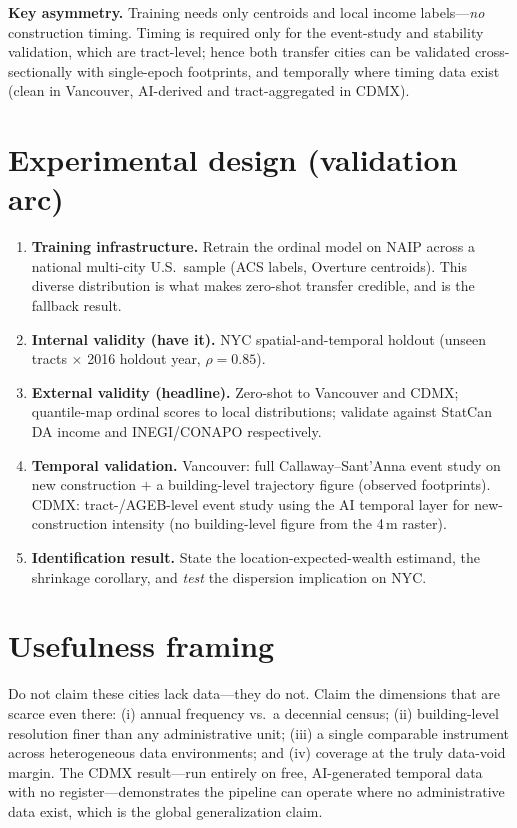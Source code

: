\documentclass[11pt]{article}
\theoremstyle{plain}
\theoremstyle{remark}
\begin{document}
\noindent\textbf{Key asymmetry.} Training needs only centroids and local income
labels---\emph{no} construction timing. Timing is required only for the event-study
and stability validation, which are tract-level; hence both transfer cities can be
validated cross-sectionally with single-epoch footprints, and temporally where
timing data exist (clean in Vancouver, AI-derived and tract-aggregated in CDMX).

\section{Experimental design (validation arc)}
\begin{enumerate}[leftmargin=1.4em,itemsep=0.2em]
\item \textbf{Training infrastructure.} Retrain the ordinal model on NAIP across a
national multi-city U.S.\ sample (ACS labels, Overture centroids). This diverse
distribution is what makes zero-shot transfer credible, and is the fallback result.
\item \textbf{Internal validity (have it).} NYC spatial-and-temporal holdout
(unseen tracts $\times$ 2016 holdout year, $\rho=0.85$).
\item \textbf{External validity (headline).} Zero-shot to Vancouver and CDMX;
quantile-map ordinal scores to local distributions; validate against StatCan DA
income and INEGI/CONAPO respectively.
\item \textbf{Temporal validation.} Vancouver: full Callaway--Sant'Anna event study
on new construction $+$ a building-level trajectory figure (observed footprints).
CDMX: tract-/AGEB-level event study using the AI temporal layer for
new-construction intensity (no building-level figure from the 4\,m raster).
\item \textbf{Identification result.} State the location-expected-wealth estimand,
the shrinkage corollary, and \emph{test} the dispersion implication on NYC.
\end{enumerate}

\section{Usefulness framing}
Do not claim these cities lack data---they do not. Claim the dimensions that are
scarce even there: (i) annual frequency vs.\ a decennial census; (ii) building-level
resolution finer than any administrative unit; (iii) a single comparable instrument
across heterogeneous data environments; and (iv) coverage at the truly data-void
margin. The CDMX result---run entirely on free, AI-generated temporal data with no
register---demonstrates the pipeline can operate where no administrative data exist,
which is the global generalization claim.
\end{document}
